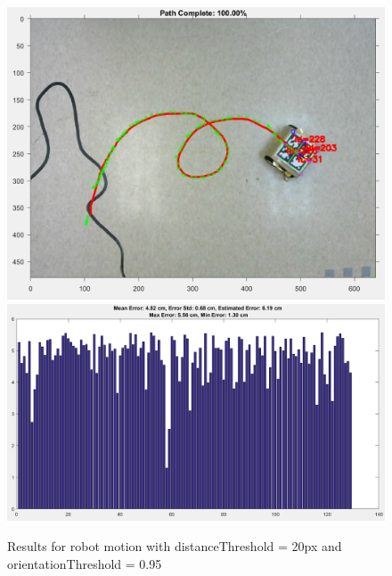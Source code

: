 \documentclass[12pt,american]{report}
\begin{document}
\begin{figure}[h!]
\centering
\includegraphics[scale=.25]{images/PATH-2095-1.PNG}
\includegraphics[scale=.25]{images/DATA-2095-1.PNG}
\caption{Results for robot motion with distanceThreshold = 20px and orientationThreshold = 0.95}
\label{fig:results1}
\end{figure}
\end{document}
